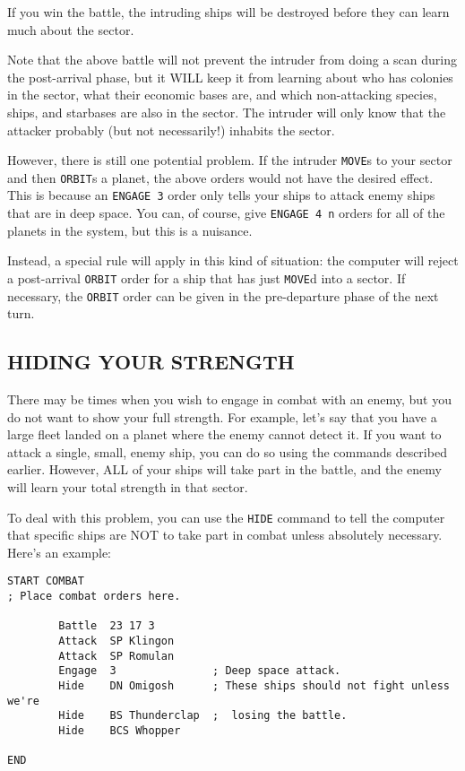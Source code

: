 \documentclass[10pt,titlepage]{article}
\begin{document}
If you win the battle, the intruding ships will be destroyed before they can
learn much about the sector.

Note that the above battle will not prevent the intruder from doing a scan
during the post-arrival phase, but it WILL keep it from learning about who has
colonies in the sector, what their economic bases are, and which non-attacking
species, ships, and starbases are also in the sector.  The intruder will only
know that the attacker probably (but not necessarily!) inhabits the sector.

However, there is still one potential problem.  If the intruder \texttt{MOVE}s to your
sector and then \texttt{ORBIT}s a planet, the above orders would not have the desired
effect.  This is because an \texttt{ENGAGE 3} order only tells your ships to attack
enemy ships that are in deep space.  You can, of course, give \texttt{ENGAGE 4 n}
orders for all of the planets in the system, but this is a nuisance.

Instead, a special rule will apply in this kind of situation: the computer will
reject a post-arrival \texttt{ORBIT} order for a ship that has just \texttt{MOVE}d into a sector.
If necessary, the \texttt{ORBIT} order can be given in the pre-departure phase of the
next turn.


\subsection{HIDING YOUR STRENGTH}
\label{sec:hidingstrength}


There may be times when you wish to engage in combat with an enemy, but you do
not want to show your full strength.  For example, let's say that you have a
large fleet landed on a planet where the enemy cannot detect it.  If you want
to attack a single, small, enemy ship, you can do so using the commands
described earlier.  However, ALL of your ships will take part in the battle,
and the enemy will learn your total strength in that sector.

To deal with this problem, you can use the \texttt{HIDE} command to tell the computer
that specific ships are NOT to take part in combat unless absolutely necessary.
Here's an example:

\begin{verbatim}
START COMBAT
; Place combat orders here.

        Battle  23 17 3
        Attack  SP Klingon
        Attack  SP Romulan
        Engage  3               ; Deep space attack.
        Hide    DN Omigosh      ; These ships should not fight unless we're
        Hide    BS Thunderclap  ;  losing the battle.
        Hide    BCS Whopper

END\end{verbatim} 
\end{document}
